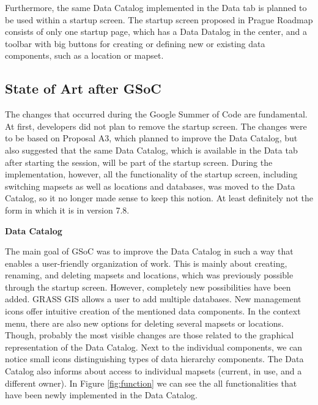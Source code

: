 \documentclass[a4paper,10pt,twoside]{article}
\begin{document}
Furthermore, the same Data Catalog implemented in the Data tab is planned to be used within a startup screen. The startup screen proposed in Prague Roadmap consists of only one startup page, which has a Data Datalog in the center, and a toolbar with big buttons for creating or defining new or existing data components, such as a location or mapset.


\subsection{State of Art after GSoC}
\label{sec:afterGSoC}

\noindent The changes that occurred during the Google Summer of Code are fundamental. At first, developers did not plan to remove the startup screen. The changes were to be based on Proposal A3, which planned to improve the Data Catalog, but also suggested that the same Data Catalog, which is available in the Data tab after starting the session, will be part of the startup screen. During the implementation, however, all the functionality of the startup screen, including switching mapsets as well as locations and databases, was moved to the Data Catalog, so it no longer made sense to keep this notion. At least definitely not the form in which it is in version 7.8.

\bigskip
\noindent \textbf {Data Catalog}

\noindent The main goal of GSoC was to improve the Data Catalog in such a way that enables a user-friendly organization of work. This is mainly about creating, renaming, and deleting mapsets and locations, which was previously possible through the startup screen. However, completely new possibilities have been added. GRASS GIS allows a user to add multiple databases. New management icons offer intuitive creation of the mentioned data components. In the context menu, there are also new options for deleting several mapsets or locations. Though, probably the most visible changes are those related to the graphical representation of the Data Catalog. Next to the individual components, we can notice small icons distinguishing types of data hierarchy components. The Data Catalog also informs about access to individual mapsets (current, in use, and a different owner). In Figure \ref{fig:function} we can see the all functionalities that have been newly implemented in the Data Catalog. 
\end{document}
